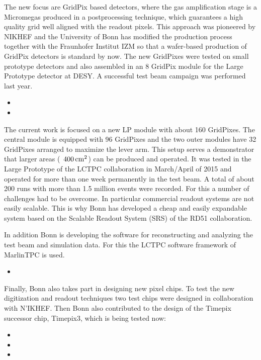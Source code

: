 The new focus are GridPix based detectors, where the gas amplification stage is a Micromegas produced in a postprocessing technique, which guarantees a high quality grid well aligned with the readout pixels. This approach was pioneered by NIKHEF and the University of Bonn has modified the production process together with the Fraunhofer Institut IZM so that a wafer-based production of GridPix detectors is standard by now. The new GridPixes were tested on small prototype detectors and also assembled in an 8 GridPix module for the Large Prototype detector at DESY. A successful test beam campaign was performed last year.
\begin{itemize}
\item {}
\item {}
\end{itemize}
The current work is focused on a new LP module with about 160 GridPixes. The central module is equipped with 96 GridPixes and the two outer modules have 32 GridPixes arranged to maximize the lever arm. This setup serves a demonstrator that larger areas (~$\unit[400]{cm^2}$) can be produced and operated. It was tested in the Large Prototype of the LCTPC collaboration in March/April of 2015 and operated for more than one week permanently in the test beam. A total of about 200 runs with more than 1.5 million events were recorded.
For this a number of challenges had to be overcome. In particular commercial readout systems are not easily scalable. This is why Bonn has developed a cheap and easily expandable system based on the Scalable Readout System (SRS) of the RD51 collaboration.

In addition Bonn is developing the software for reconstructing and analyzing the test beam and simulation data. For this the LCTPC software framework of MarlinTPC is used.
\begin{itemize}
\item {}
\end{itemize}

Finally, Bonn also takes part in designing new pixel chips. To test the new digitization and readout techniques two test chips were designed in collaboration with N'IKHEF. Then Bonn also contributed to the design of the Timepix successor chip, Timepix3, which is being tested now:
\begin{itemize}
\item {}
\item {}
\item {}
\end{itemize}

